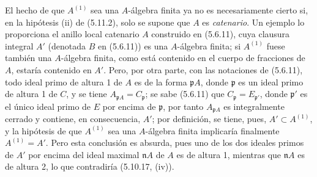 \begin{remark}[5.11.3]
\label{IV.2.s5.11.3-fr}
El hecho de que $A^{(1)}$ sea una $A$-álgebra finita ya no es necesariamente
cierto si, en la hipótesis (ii) de (5.11.2), solo se supone que $A$ es
\emph{catenario}. Un ejemplo lo proporciona el anillo local catenario $A$ construido
en (5.6.11), cuya clausura integral $A'$ (denotada $B$ en (5.6.11)) es una
$A$-álgebra finita; si $A^{(1)}$ fuese también una $A$-álgebra finita, como
está contenido en el cuerpo de fracciones de $A$, estaría contenido en $A'$.
Pero, por otra parte, con las notaciones de (5.6.11), todo ideal primo de
altura 1 de $A$ es de la forma $\mathfrak pA$, donde $\mathfrak p$ es un ideal
primo de altura 1 de $C$, y se tiene
$A_{\mathfrak pA}=C_\mathfrak p$; se sabe (5.6.11) que
$C_\mathfrak p=E_{\mathfrak p'}$, donde $\mathfrak p'$ es el único ideal
primo de $E$ por encima de $\mathfrak p$, por tanto $A_{\mathfrak pA}$ es
integralmente cerrado y contiene, en consecuencia, $A'$; por definición, se
tiene, pues, $A'\subset A^{(1)}$, y la hipótesis de que $A^{(1)}$ sea una
$A$-álgebra finita implicaría finalmente $A^{(1)}=A'$. Pero esta conclusión
es absurda, pues uno de los dos ideales primos de $A'$ por encima del ideal
maximal $\mathfrak nA$ de $A$ es de altura 1, mientras que $\mathfrak nA$ es
de altura 2, lo que contradiría (5.10.17, (iv)).
\end{remark}

